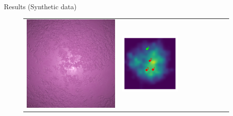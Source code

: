 \documentclass[final]{beamer}
\newlength{\twocolwid}
\newlength{\resultwidth}
\begin{document}
\begin{frame}[t]
\begin{columns}[t]
\begin{column}{\twocolwid}
\begin{block}{Results (Synthetic data)}
\begin{figure}[t]
\begin{tabular}{ccrclcccc}
            		\includegraphics[width=\resultwidth]{synth/plaster/optim.jpg} &
            		\includegraphics[width=\resultwidth]{synth/plaster/posterior.pdf} &

\end{tabular}
\end{figure}
\end{block}
\end{column}
\end{columns}
\end{frame}
\end{document}
